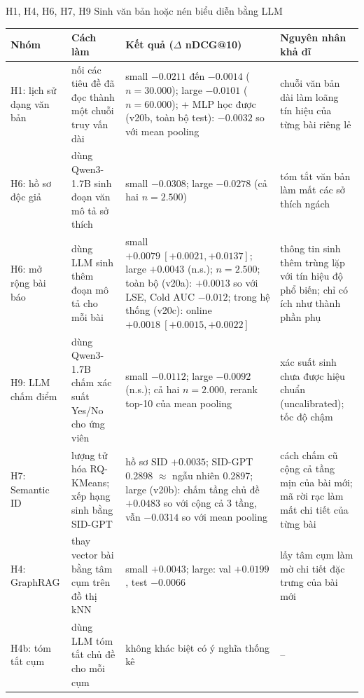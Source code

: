 \documentclass[aspectratio=169,t]{beamer}
\begin{document}
\begin{frame}[shrink]{H1, H4, H6, H7, H9 \textperiodcentered{} Sinh văn bản hoặc nén biểu diễn bằng LLM}
\scriptsize
\renewcommand{\arraystretch}{1.02}
\setlength{\tabcolsep}{4pt}
\begin{tabularx}{\textwidth}{@{}P{2.3cm}P{3.55cm}P{4.55cm}Y@{}}
\toprule
\textbf{Nhóm} & \textbf{Cách làm} & \textbf{Kết quả ($\Delta$ nDCG@10)} & \textbf{Nguyên nhân khả dĩ}\\
\midrule
H1: lịch sử dạng văn bản & nối các tiêu đề đã đọc thành một chuỗi truy vấn dài & small $-0.0211$ đến $-0.0014$ ($n=30.000$); large $-0.0101$ ($n=60.000$); + MLP học được (v20b, toàn bộ test): $-0.0032$ so với mean pooling & chuỗi văn bản dài làm loãng tín hiệu của từng bài riêng lẻ\\
H6: hồ sơ độc giả & dùng Qwen3-1.7B sinh đoạn văn mô tả sở thích & small $-0.0308$; large $-0.0278$ (cả hai $n=2.500$) & tóm tắt văn bản làm mất các sở thích ngách\\
H6: mở rộng bài báo & dùng LLM sinh thêm đoạn mô tả cho mỗi bài & small $+0.0079\ [+0.0021, +0.0137]$; large $+0.0043$ (n.s.); $n=2.500$; toàn bộ (v20a): $+0.0013$ so với LSE, Cold AUC $-0.012$; trong hệ thống (v20c): online $+0.0018\ [+0.0015, +0.0022]$ & thông tin sinh thêm trùng lặp với tín hiệu độ phổ biến; chỉ có ích như thành phần phụ\\
H9: LLM chấm điểm & dùng Qwen3-1.7B chấm xác suất Yes/No cho ứng viên & small $-0.0112$; large $-0.0092$ (n.s.); cả hai $n=2.000$, rerank top-10 của mean pooling & xác suất sinh chưa được hiệu chuẩn (uncalibrated); tốc độ chậm\\
H7: Semantic ID & lượng tử hóa RQ-KMeans; xếp hạng sinh bằng SID-GPT & hồ sơ SID $+0.0035$; SID-GPT 0.2898 $\approx$ ngẫu nhiên 0.2897; large (v20b): chấm tầng chủ đề $+0.0483$ so với cộng cả 3 tầng, vẫn $-0.0314$ so với mean pooling & cách chấm cũ cộng cả tầng mịn của bài mới; mã rời rạc làm mất chi tiết của từng bài\\
H4: GraphRAG & thay vector bài bằng tâm cụm trên đồ thị kNN & small $+0.0043$; large: val $+0.0199$, test $-0.0066$ & lấy tâm cụm làm mờ chi tiết đặc trưng của bài mới\\
H4b: tóm tắt cụm & dùng LLM tóm tắt chủ đề cho mỗi cụm & không khác biệt có ý nghĩa thống kê & --\\
\bottomrule
\end{tabularx}
\par\kern0pt%
\end{frame}
\end{document}
